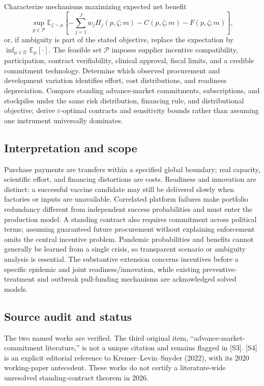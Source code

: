 \documentclass[11pt,a4paper]{article}
\begin{document}
Characterize mechanisms maximizing expected net benefit
\[
 \sup_{p\in\mathcal P}\mathbb E_{\zeta\sim\mu}\left[-\sum_{j=1}^{J}w_jH_j(p,\zeta;m)-C(p,\zeta;m)-F(p,\zeta;m)\right],
\]
or, if ambiguity is part of the stated objective, replace the expectation by $\inf_{\mu\in\mathcal U}\mathbb E_\mu[\cdot]$. The feasible set $\mathcal P$ imposes supplier incentive compatibility, participation, contract verifiability, clinical approval, fiscal limits, and a credible commitment technology. Determine which observed procurement and development variation identifies effort, cost distributions, and readiness depreciation. Compare standing advance-market commitments, subscriptions, and stockpiles under the same risk distribution, financing rule, and distributional objective; derive $\varepsilon$-optimal contracts and sensitivity bounds rather than assuming one instrument universally dominates.

\subsection*{Interpretation and scope}
Purchase payments are transfers within a specified global boundary; real capacity, scientific effort, and financing distortions are costs. Readiness and innovation are distinct: a successful vaccine candidate may still be delivered slowly when factories or inputs are unavailable. Correlated platform failures make portfolio redundancy different from independent success probabilities and must enter the production model. A standing contract also requires commitment across political terms; assuming guaranteed future procurement without explaining enforcement omits the central incentive problem. Pandemic probabilities and benefits cannot generally be learned from a single crisis, so transparent scenario or ambiguity analysis is essential. The substantive extension concerns incentives before a specific epidemic and joint readiness/innovation, while existing preventive-treatment and outbreak pull-funding mechanisms are acknowledged solved models.

\subsection*{Source audit and status}
The two named works are verified. The third original item, “advance-market-commitment literature,” is not a unique citation and remains flagged in [S3]. [S4] is an explicit editorial reference to Kremer--Levin--Snyder (2022), with its 2020 working-paper antecedent. These works do not certify a literature-wide unresolved standing-contract theorem in 2026.
\end{document}
